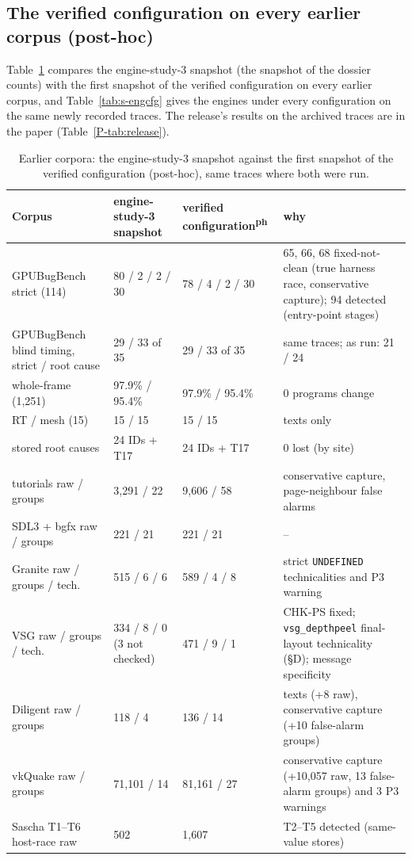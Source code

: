 \documentclass[acmtog,anonymous,review]{acmart}
\newcommand{\bench}{GPUBugBench\xspace}
\newcommand{\code}[1]{\texttt{#1}}
\newcommand{\posthoc}{\textsuperscript{\textsf{ph}}}
\begin{document}
\subsection{The verified configuration on every earlier corpus (post-hoc)}
Table~\ref{tab:s-regress} compares the engine-study-3 snapshot (the snapshot of the dossier counts) with the first
snapshot of the verified configuration on every earlier corpus, and Table~\ref{tab:s-engcfg} gives the engines under
every configuration on the same newly recorded traces. The release's results on the archived traces are in the paper
(Table~\ref{P-tab:release}).
\begin{table}[t]
\caption{Earlier corpora: the engine-study-3 snapshot against the first snapshot of the verified configuration
(post-hoc), same traces where both were run.}
\label{tab:s-regress}
\small
\begin{tabular}{@{}p{}p{}p{}p{}@{}}
\toprule
Corpus & engine-study-3 snapshot & verified configuration\posthoc & why \\
\midrule
\bench strict (114) & 80 / 2 / 2 / 30 & 78 / 4 / 2 / 30 & 65, 66, 68 fixed-not-clean (true harness race, conservative capture); 94 detected (entry-point stages) \\
\bench blind timing, strict / root cause & 29 / 33 of 35 & 29 / 33 of 35 & same traces; as run: 21 / 24 \\
whole-frame (1,251) & 97.9\% / 95.4\% & 97.9\% / 95.4\% & 0 programs change \\
RT / mesh (15) & 15 / 15 & 15 / 15 & texts only \\
stored root causes & 24 IDs + T17 & 24 IDs + T17 & 0 lost (by site) \\
tutorials raw / groups & 3,291 / 22 & 9,606 / 58 & conservative capture, page-neighbour false alarms \\
SDL3 + bgfx raw / groups & 221 / 21 & 221 / 21 & -- \\
Granite raw / groups / tech. & 515 / 6 / 6 & 589 / 4 / 8 & strict \code{UNDEFINED} technicalities and P3 warning \\
VSG raw / groups / tech. & 334 / 8 / 0 (3 not checked) & 471 / 9 / 1 & CHK-PS fixed; \code{vsg\_depthpeel} final-layout technicality (\S D); message specificity \\
Diligent raw / groups & 118 / 4 & 136 / 14 & texts (+8 raw), conservative capture (+10 false-alarm groups) \\
vkQuake raw / groups & 71,101 / 14 & 81,161 / 27 & conservative capture (+10,057 raw, 13 false-alarm groups) and 3 P3 warnings \\
Sascha T1--T6 host-race raw & 502 & 1,607 & T2--T5 detected (same-value stores) \\
\bottomrule
\end{tabular}
\end{table}
\end{document}

